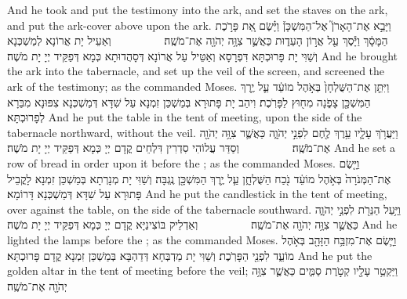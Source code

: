 {And he took and put the testimony into the ark, and set the staves on the ark, and put the ark-cover above upon the ark.}{}
{וַיָּבֵ֣א אֶת־הָאָרֹן֮ אֶל־הַמִּשְׁכָּן֒ וַיָּ֗שֶׂם אֵ֚ת פָּרֹ֣כֶת הַמָּסָ֔ךְ וַיָּ֕סֶךְ עַ֖ל אֲר֣וֹן הָעֵד֑וּת כַּאֲשֶׁ֛ר צִוָּ֥ה יְהֹוָ֖ה אֶת־מֹשֶֽׁה׃ \setuma         }
{וְאַעֵיל יָת אֲרוֹנָא לְמַשְׁכְּנָא וְשַׁוִּי יָת פָּרוּכְתָּא דִּפְרָסָא וְאַטֵּיל עַל אֲרוֹנָא דְּסָהֲדוּתָא כְּמָא דְּפַקֵּיד יְיָ יָת מֹשֶׁה׃}
{And he brought the ark into the tabernacle, and set up the veil of the screen, and screened the ark of the testimony; as the \lord\space commanded Moses.}{}
{וַיִּתֵּ֤ן אֶת־הַשֻּׁלְחָן֙ בְּאֹ֣הֶל מוֹעֵ֔ד עַ֛ל יֶ֥רֶךְ הַמִּשְׁכָּ֖ן צָפֹ֑נָה מִח֖וּץ לַפָּרֹֽכֶת׃
}
{וִיהַב יָת פָּתוּרָא בְּמַשְׁכַּן זִמְנָא עַל שִׁדָּא דְּמַשְׁכְּנָא צִפּוּנָא מִבַּרָא לְפָרוּכְתָּא׃}
{And he put the table in the tent of meeting, upon the side of the tabernacle northward, without the veil.}{}
{וַיַּעֲרֹ֥ךְ עָלָ֛יו עֵ֥רֶךְ לֶ֖חֶם לִפְנֵ֣י יְהֹוָ֑ה כַּאֲשֶׁ֛ר צִוָּ֥ה יְהֹוָ֖ה אֶת־מֹשֶֽׁה׃ \setuma         }
{וְסַדַּר עֲלוֹהִי סִדְרִין דִּלְחֵים קֳדָם יְיָ כְּמָא דְּפַקֵּיד יְיָ יָת מֹשֶׁה׃}
{And he set a row of bread in order upon it before the \lord; as the \lord\space commanded Moses.}{}
{וַיָּ֤שֶׂם אֶת־הַמְּנֹרָה֙ בְּאֹ֣הֶל מוֹעֵ֔ד נֹ֖כַח הַשֻּׁלְחָ֑ן עַ֛ל יֶ֥רֶךְ הַמִּשְׁכָּ֖ן נֶֽגְבָּה׃}
{וְשַׁוִּי יָת מְנָרְתָא בְּמַשְׁכַּן זִמְנָא לָקֳבֵיל פָּתוּרָא עַל שִׁדָּא דְּמַשְׁכְּנָא דָּרוֹמָא׃}
{And he put the candlestick in the tent of meeting, over against the table, on the side of the tabernacle southward.}{}
{וַיַּ֥עַל הַנֵּרֹ֖ת לִפְנֵ֣י יְהֹוָ֑ה כַּאֲשֶׁ֛ר צִוָּ֥ה יְהֹוָ֖ה אֶת־מֹשֶֽׁה׃ \setuma         }
{וְאַדְלֵיק בּוֹצִינַיָּא קֳדָם יְיָ כְּמָא דְּפַקֵּיד יְיָ יָת מֹשֶׁה׃}
{And he lighted the lamps before the \lord; as the \lord\space commanded Moses.}{}
{וַיָּ֛שֶׂם אֶת־מִזְבַּ֥ח הַזָּהָ֖ב בְּאֹ֣הֶל מוֹעֵ֑ד לִפְנֵ֖י הַפָּרֹֽכֶת׃}
{וְשַׁוִּי יָת מַדְבְּחָא דְּדַהְבָּא בְּמַשְׁכַּן זִמְנָא קֳדָם פָּרוּכְתָּא׃}
{And he put the golden altar in the tent of meeting before the veil;}{}
{וַיַּקְטֵ֥ר עָלָ֖יו קְטֹ֣רֶת סַמִּ֑ים כַּאֲשֶׁ֛ר צִוָּ֥ה יְהֹוָ֖ה אֶת־מֹשֶֽׁה׃ \setuma         
}
